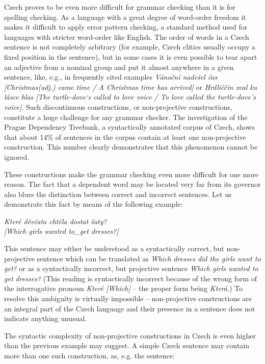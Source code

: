 \documentclass[]{../../metanetpaper}
\begin{document}
\begin{multicols}{2}
Czech proves to be even more difficult for grammar checking than it is for spelling checking. As a language with a great degree of word-order freedom it makes it difficult to apply error pattern checking, a standard method used for languages with stricter word-order like English. The order of words in a Czech sentence is not completely arbitrary (for example, Czech clitics usually occupy a fixed position in the sentence), but in some cases it is even possible to tear apart an adjective from a nominal group and put it almost anywhere in a given sentence, like, e.g., in frequently cited examples \textit{Vánoční nadešel čas {[}Christmas(adj.) came time / A Christmas time has arrived{]}} or \textit{Hrdliččin zval ku lásce hlas {[}The turtle-dove‘s called to love voice / To love called the turtle-dove’s voice{]}}. Such discontinuous constructions, or non-projective constructions, constitute a huge challenge for any grammar checker. The investigation of the Prague Dependency Treebank, a syntactically annotated corpus of Czech, shows that about 14\% of sentences in the corpus contain at least one non-projective construction. This number clearly demonstrates that this phenomenon cannot be ignored.

These constructions make the grammar checking even more difficult for one more reason. The fact that a dependent word may be located very far from its governor also blurs the distinction between correct and incorrect sentences. Let us demonstrate this fact by means of the following example:

\textit{Které děvčata chtěla dostat šaty?\\
{[}Which girls wanted to\_get dresses?{]}}

This sentence may either be understood as a syntactically correct, but non-projective sentence which can be translated as \textit{Which dresses did the girls want to get?} or as a syntactically incorrect, but projective sentence \textit{Which girls wanted to get dresses?} (This reading is syntactically incorrect because of the wrong form of the interrogative pronoun \textit{Které {[}Which{]}} – the proper form being \textit{Která}.) To resolve this ambiguity is virtually impossible – non-projective constructions are an integral part of the Czech language and their presence in a sentence does not indicate anything unusual.

The syntactic complexity of non-projective constructions in Czech is even higher than the previous example may suggest. A simple Czech sentence may contain more than one such construction, as, e.g. the sentence:


\end{multicols}
\end{document}
